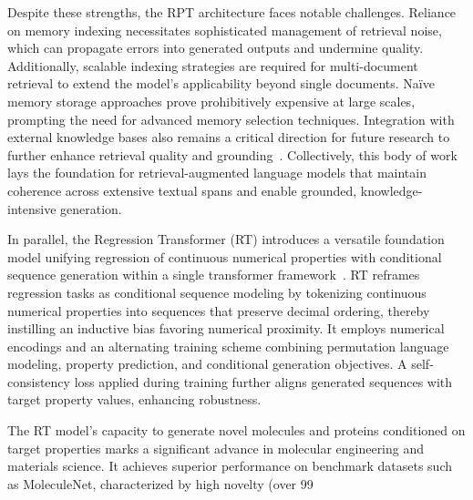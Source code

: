 \documentclass[sigconf]{acmart}
\begin{document}
Despite these strengths, the RPT architecture faces notable challenges. Reliance on memory indexing necessitates sophisticated management of retrieval noise, which can propagate errors into generated outputs and undermine quality. Additionally, scalable indexing strategies are required for multi-document retrieval to extend the model's applicability beyond single documents. Naïve memory storage approaches prove prohibitively expensive at large scales, prompting the need for advanced memory selection techniques. Integration with external knowledge bases also remains a critical direction for future research to further enhance retrieval quality and grounding~\cite{ref29}. Collectively, this body of work lays the foundation for retrieval-augmented language models that maintain coherence across extensive textual spans and enable grounded, knowledge-intensive generation.

In parallel, the Regression Transformer (RT) introduces a versatile foundation model unifying regression of continuous numerical properties with conditional sequence generation within a single transformer framework~\cite{ref20}. RT reframes regression tasks as conditional sequence modeling by tokenizing continuous numerical properties into sequences that preserve decimal ordering, thereby instilling an inductive bias favoring numerical proximity. It employs numerical encodings and an alternating training scheme combining permutation language modeling, property prediction, and conditional generation objectives. A self-consistency loss applied during training further aligns generated sequences with target property values, enhancing robustness.

The RT model’s capacity to generate novel molecules and proteins conditioned on target properties marks a significant advance in molecular engineering and materials science. It achieves superior performance on benchmark datasets such as MoleculeNet, characterized by high novelty (over 99%
\end{document}
